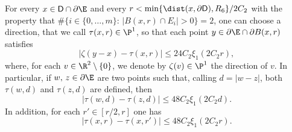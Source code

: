 \begin{cor}\label{cor1pg}
For every $x\in \mathsf{D}\cap \partial\E$ and every $r< \min\{\dist(x,\partial \mathsf{D}),R_6\}/2C_2$ with the property that $\#\big\{i\in\{0,\dots,m\}:\,|B(x,r)\cap E_i|>0\big\}=2$, one can choose a direction, that we call $\tau(x,r)\in\P^1$, so that each point $y\in\partial\E\cap\partial B(x,r)$ satisfies
\begin{equation}\label{firstone}
|\zeta(y-x)- \tau(x,r)| \leq 24 C_2 \xi_1(2C_2 r),
\end{equation}
where, for each $v\in\R^2\setminus\{0\}$, we denote by $\zeta(v)\in\P^1$ the direction of $v$. In particular, if $w,\,z\in\partial\E$ are two points such that, calling $d=|w-z|$, both $\tau(w,d)$ and $\tau(z,d)$ are defined, then
\begin{equation}\label{thirdone}
|\tau(w,d) - \tau(z,d) | \leq 48 C_2 \xi_1(2C_2 d).
\end{equation}
In addition, for each $r' \in [r/2,r]$ one has
\begin{equation}\label{secondone}
|\tau(x,r)-\tau(x,r')| \leq 48 C_2 \xi_1(2C_2 r).
\end{equation}

\end{cor}
